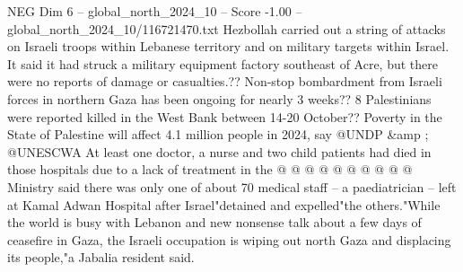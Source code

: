\begin{textsample}{NEG Dim 6 – global\_north\_2024\_10 – Score -1.00 – global\_north\_2024\_10/116721470.txt}
Hezbollah carried out a string of attacks on Israeli troops within Lebanese territory and on military targets within Israel.
It said it had struck a military equipment factory southeast of Acre, but there were no reports of damage or casualties.??
Non-stop bombardment from Israeli forces in northern Gaza has been ongoing for nearly 3 weeks?? 8 Palestinians were reported killed in the West Bank between 14-20 October??
Poverty in the State of Palestine will affect 4.1 million people in 2024, say @UNDP \&amp ; @UNESCWA At least one doctor, a nurse and two child patients had died in those hospitals due to a lack of treatment in the @ @ @ @ @ @ @ @ @ @ Ministry said there was only one of about 70 medical staff -- a paediatrician -- left at Kamal Adwan Hospital after Israel"detained and expelled"the others."While the world is busy with Lebanon and new nonsense talk about a few days of ceasefire in Gaza, the Israeli occupation is wiping out north Gaza and displacing its people,"a Jabalia resident said.

\end{textsample}
